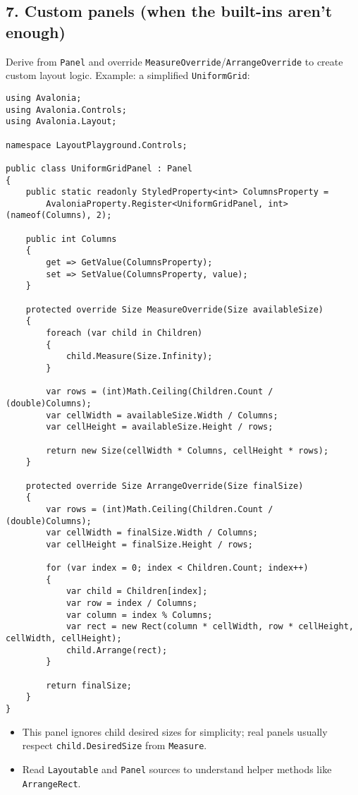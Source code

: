 \subsection{7. Custom panels (when the built-ins aren't
enough)}\label{custom-panels-when-the-built-ins-arent-enough}

Derive from \passthrough{\lstinline!Panel!} and override
\passthrough{\lstinline!MeasureOverride!}/\passthrough{\lstinline!ArrangeOverride!}
to create custom layout logic. Example: a simplified
\passthrough{\lstinline!UniformGrid!}:

\begin{lstlisting}
using Avalonia;
using Avalonia.Controls;
using Avalonia.Layout;

namespace LayoutPlayground.Controls;

public class UniformGridPanel : Panel
{
    public static readonly StyledProperty<int> ColumnsProperty =
        AvaloniaProperty.Register<UniformGridPanel, int>(nameof(Columns), 2);

    public int Columns
    {
        get => GetValue(ColumnsProperty);
        set => SetValue(ColumnsProperty, value);
    }

    protected override Size MeasureOverride(Size availableSize)
    {
        foreach (var child in Children)
        {
            child.Measure(Size.Infinity);
        }

        var rows = (int)Math.Ceiling(Children.Count / (double)Columns);
        var cellWidth = availableSize.Width / Columns;
        var cellHeight = availableSize.Height / rows;

        return new Size(cellWidth * Columns, cellHeight * rows);
    }

    protected override Size ArrangeOverride(Size finalSize)
    {
        var rows = (int)Math.Ceiling(Children.Count / (double)Columns);
        var cellWidth = finalSize.Width / Columns;
        var cellHeight = finalSize.Height / rows;

        for (var index = 0; index < Children.Count; index++)
        {
            var child = Children[index];
            var row = index / Columns;
            var column = index % Columns;
            var rect = new Rect(column * cellWidth, row * cellHeight, cellWidth, cellHeight);
            child.Arrange(rect);
        }

        return finalSize;
    }
}
\end{lstlisting}

\begin{itemize}
\tightlist
\item
  This panel ignores child desired sizes for simplicity; real panels
  usually respect \passthrough{\lstinline!child.DesiredSize!} from
  \passthrough{\lstinline!Measure!}.
\item
  Read \passthrough{\lstinline!Layoutable!} and
  \passthrough{\lstinline!Panel!} sources to understand helper methods
  like \passthrough{\lstinline!ArrangeRect!}.
\end{itemize}

